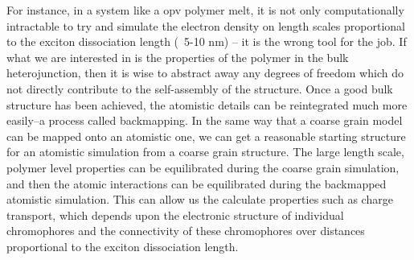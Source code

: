 For instance, in a system like a opv polymer melt, it is not only computationally intractable to try and simulate the electron density on length scales proportional to the exciton dissociation length (~5-10 nm)\cite{Huang2010} -- it is the wrong tool for the job.
If what we are interested in is the properties of the polymer in the bulk heterojunction, then it is wise to abstract away any degrees of freedom which do not directly contribute to the self-assembly of the structure.
Once a good bulk structure has been achieved, the atomistic details can be reintegrated much more easily--a process called backmapping.
In the same way that a coarse grain model can be mapped onto an atomistic one, we can get a reasonable starting structure for an atomistic simulation from a coarse grain structure.
The large length scale, polymer level properties can be equilibrated during the coarse grain simulation, and then the atomic interactions can be equilibrated during the backmapped atomistic simulation.
This can allow us the calculate properties such as charge transport, which depends upon the electronic structure of individual chromophores and the connectivity of these chromophores over distances proportional to the exciton dissociation length.


